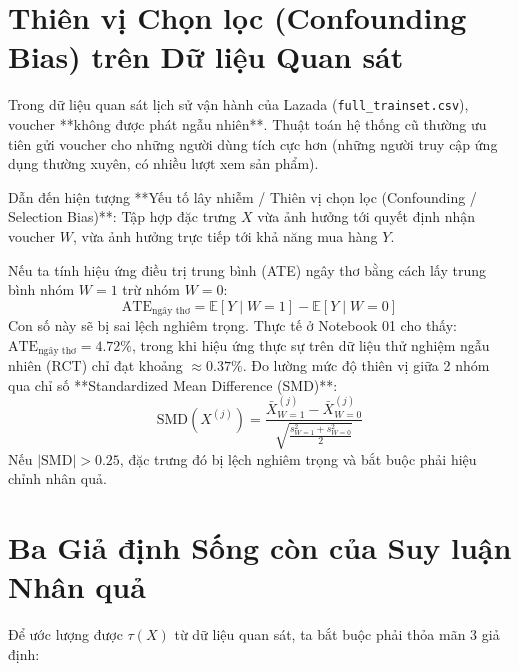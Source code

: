 \section{Thiên vị Chọn lọc (Confounding Bias) trên Dữ liệu Quan sát}

Trong dữ liệu quan sát lịch sử vận hành của Lazada (\texttt{full\_trainset.csv}), voucher **không được phát ngẫu nhiên**. Thuật toán hệ thống cũ thường ưu tiên gửi voucher cho những người dùng tích cực hơn (những người truy cập ứng dụng thường xuyên, có nhiều lượt xem sản phẩm).

Dẫn đến hiện tượng **Yếu tố lây nhiễm / Thiên vị chọn lọc (Confounding / Selection Bias)**: Tập hợp đặc trưng $X$ vừa ảnh hưởng tới quyết định nhận voucher $W$, vừa ảnh hưởng trực tiếp tới khả năng mua hàng $Y$.

Nếu ta tính hiệu ứng điều trị trung bình (ATE) ngây thơ bằng cách lấy trung bình nhóm $W=1$ trừ nhóm $W=0$:
\begin{equation}
    \text{ATE}_{\text{ngây thơ}} = \mathbb{E}[Y \mid W=1] - \mathbb{E}[Y \mid W=0]
\end{equation}
Con số này sẽ bị sai lệch nghiêm trọng. Thực tế ở Notebook 01 cho thấy: $\text{ATE}_{\text{ngây thơ}} = 4.72\%$, trong khi hiệu ứng thực sự trên dữ liệu thử nghiệm ngẫu nhiên (RCT) chỉ đạt khoảng $\approx 0.37\%$. Đo lường mức độ thiên vị giữa 2 nhóm qua chỉ số **Standardized Mean Difference (SMD)**:
\begin{equation}
    \text{SMD}(X^{(j)}) = \frac{\bar{X}^{(j)}_{W=1} - \bar{X}^{(j)}_{W=0}}{\sqrt{\frac{s_{W=1}^2 + s_{W=0}^2}{2}}}
\end{equation}
Nếu $|\text{SMD}| > 0.25$, đặc trưng đó bị lệch nghiêm trọng và bắt buộc phải hiệu chỉnh nhân quả.

\section{Ba Giả định Sống còn của Suy luận Nhân quả}

Để ước lượng được $\tau(X)$ từ dữ liệu quan sát, ta bắt buộc phải thỏa mãn 3 giả định:

